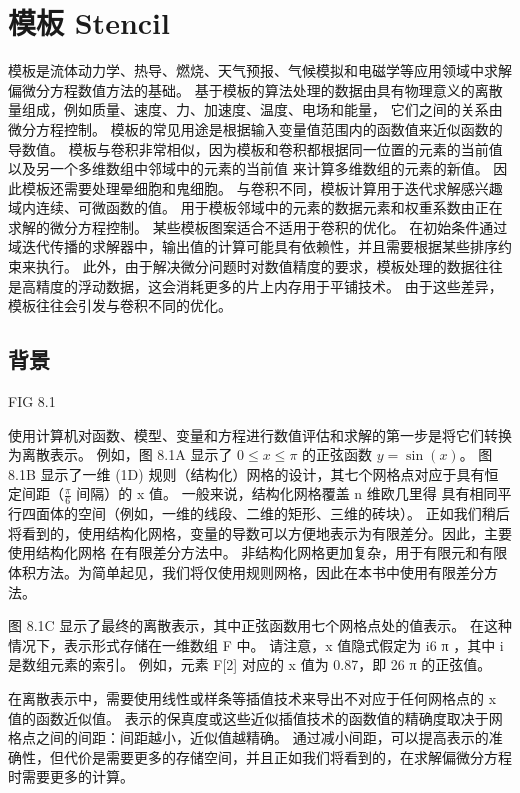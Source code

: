 \section{模板 Stencil}
模板是流体动力学、热导、燃烧、天气预报、气候模拟和电磁学等应用领域中求解偏微分方程数值方法的基础。 
基于模板的算法处理的数据由具有物理意义的离散量组成，例如质量、速度、力、加速度、温度、电场和能量，
它们之间的关系由微分方程控制。 模板的常见用途是根据输入变量值范围内的函数值来近似函数的导数值。 
模板与卷积非常相似，因为模板和卷积都根据同一位置的元素的当前值以及另一个多维数组中邻域中的元素的当前值
来计算多维数组的元素的新值。 因此模板还需要处理晕细胞和鬼细胞。 与卷积不同，模板计算用于迭代求解感兴趣域内连续、可微函数的值。 
用于模板邻域中的元素的数据元素和权重系数由正在求解的微分方程控制。 某些模板图案适合不适用于卷积的优化。 
在初始条件通过域迭代传播的求解器中，输出值的计算可能具有依赖性，并且需要根据某些排序约束来执行。 
此外，由于解决微分问题时对数值精度的要求，模板处理的数据往往是高精度的浮动数据，这会消耗更多的片上内存用于平铺技术。 
由于这些差异，模板往往会引发与卷积不同的优化。

\subsection{背景}
{\color{red} FIG 8.1}

使用计算机对函数、模型、变量和方程进行数值评估和求解的第一步是将它们转换为离散表示。 
例如，图 8.1A 显示了 $0 \leq x \leq \pi$ 的正弦函数 $y = \sin(x)$。 
图 8.1B 显示了一维 (1D) 规则（结构化）网格的设计，其七个网格点对应于具有恒定间距（$\frac{\pi}{6}$ 间隔）的 x 值。
一般来说，结构化网格覆盖 n 维欧几里得 具有相同平行四面体的空间（例如，一维的线段、二维的矩形、三维的砖块）。
正如我们稍后将看到的，使用结构化网格，变量的导数可以方便地表示为有限差分。因此，主要使用结构化网格 在有限差分方法中。
非结构化网格更加复杂，用于有限元和有限体积方法。为简单起见，我们将仅使用规则网格，因此在本书中使用有限差分方法。

图 8.1C 显示了最终的离散表示，其中正弦函数用七个网格点处的值表示。 在这种情况下，表示形式存储在一维数组 F 中。
请注意，x 值隐式假定为 i6 π ，其中 i 是数组元素的索引。 例如，元素 F[2] 对应的 x 值为 0.87，即 26 π 的正弦值。

在离散表示中，需要使用线性或样条等插值技术来导出不对应于任何网格点的 x 值的函数近似值。 
表示的保真度或这些近似插值技术的函数值的精确度取决于网格点之间的间距：间距越小，近似值越精确。 
通过减小间距，可以提高表示的准确性，但代价是需要更多的存储空间，并且正如我们将看到的，在求解偏微分方程时需要更多的计算。

